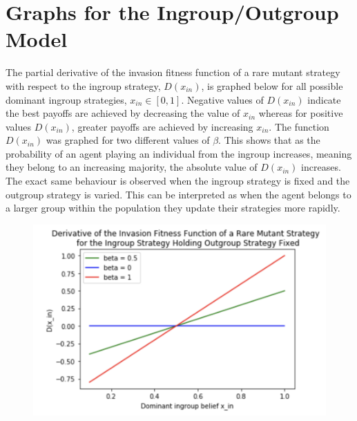 \documentclass[]{llncs}
\begin{document}
\section{Graphs for the Ingroup/Outgroup Model}
The partial derivative of the invasion fitness function of a rare mutant strategy with respect to the ingroup strategy, $D(x_{in})$, is graphed below for all possible dominant ingroup strategies, $x_{in} \in [0,1]$. Negative values of $D(x_{in})$ indicate the best payoffs are achieved by decreasing the value of $x_{in} $ whereas for positive values $D(x_{in})$, greater payoffs are achieved by increasing  $x_{in} $. The function $D(x_{in})$ was graphed for two different values of $\beta$. This shows that as the probability of an agent playing an individual from the ingroup increases, meaning they belong to an increasing majority, the absolute value of $D(x_{in})$ increases. The exact same behaviour is observed when the ingroup strategy is fixed and the outgroup strategy is varied. This can be interpreted as when the agent belongs to a larger group within the population they update their strategies more rapidly. 

\begin{figure}
\centering
\includegraphics[width=12cm]{images/beta_ingroup_graph}
\end{figure}
\end{document}
